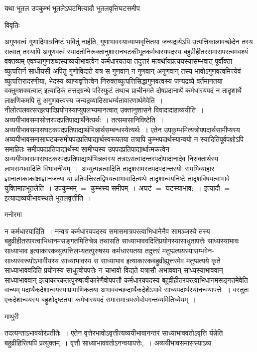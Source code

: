 \documentclass[10pt, openany]{book}
\begin{document}
{{\la यथा भूतल उपकुम्भं भूतलेऽघटमित्यादौ भूतलवृत्तिघटसमीप}
\begin{center}     विवृतिः \end{center}
अगुणवत्वं गुणादिमात्रनिष्टं भवितुं नार्हति,  गुणाभावस्याव्याप्यवृत्तितया जन्यद्रव्येऽपि उत्पत्तिकालावच्छेदेन तस्य सत्वात् तस्यापि अगुणवत्वं स्यादतोनिरूक्तानुशासनघटकीभूतकर्मधारयपदस्य बहुव्रीहीतरसमासपरत्वमवश्यं वक्तव्यम् एवञ्चागुणशब्दस्याव्ययीभावत्वेन कर्मधारयतया तदुत्तरं मत्वर्थीयप्रत्ययस्यासम्भवात् पूर्वोक्ता व्युत्पत्तिर्न साधीयसी अपितु गुणोविद्यते यत्र स गुणवान् न गुणवान् अगुणवान् तस्य भावोऽगुणवत्वमित्त्येवं व्युत्पत्तिरादरणीया, भेदस्य
व्याप्यवृत्तित्वेन निरुक्तव्युत्पत्तिसिद्धागुणवत्वस्य जन्यद्रव्ये वर्तमानतया वक्तुमशक्यत्वात् इत्यादिकं तत्तद्ग्रन्थे परिस्फुटं तथाच प्राचीनमते दोषप्रदानार्थे कर्मधारयपदं न तादृशार्थे
लाक्षणिकमपि तु अगुणवत्त्वस्य जन्यद्रव्यादिसाधर्म्यतावारणार्थमेवेति~। नीलोत्पलवत्सरइत्यादिप्रयोगस्याप्युपलभ्यमानत्वात् उक्तानुशासने विवादादाहाव्ययीति~।
अव्ययीभावसमासोत्तरपदप्रतिपाद्यार्थेनेत्यर्थः~। {\la तत्समासानिविष्टेति~।} अव्ययीभावसमासघटकपदप्रतिपाद्यार्थभिन्नार्थसम्बन्धस्येत्यर्थः~। एतेन
उपकुम्भमित्यत्रोपपदार्थसामीप्यस्य अव्ययीभावसमासाघटकसमीपपदप्रतिपाद्यार्थस्वरूपतया तत्रापि कुम्भपदार्थस्यान्वयो न स्यादितिपूर्वपक्षोऽपि समाहितः
समीपपदप्रतिपाद्यार्थस्य सामीप्यस्य उपपदप्रतिपाद्यार्थात्मकत्वेन अव्ययीभावसमासघटकरपदप्रतिपाद्यार्थभिन्नत्वस्य तत्राऽसत्वादन्तरपदोपादानादेव निरुक्तार्थस्य लाभसम्भवादिति विभावनीयम्~।~{\la अव्युत्पन्नत्वादिति} तादृशसमस्तपदपदान्तरयोः समभिव्याहार ज्ञानात्मकाकांक्षाज्ञानजन्या या प्रतिपत्तिस्तद्विषयत्वाभावादित्यर्थः
तादृशान्वयनिष्टे तादृशविषयत्वाभावे युक्तिमाहभूतलेति~। उपकुम्भम् $=$ कुम्भस्य समीपम्~। अघटं $=$  घटस्याभाव:~। इत्यादौ $=$ इत्याद्यव्ययीभावस्थले {\la भूतलवृत्तीति~।}
\begin{center}   मनोरमा  \end{center}

{\la न कर्मधारयादिति~।} नन्वत्र कर्मधारयपदस्य समासमात्रपरत्वाभिधानेनैव सामञ्जस्ये तस्य बहुव्रीहीतरपरत्वाभिधानमसङ्गतमितिचेन्न तथासति
साध्याभाववदितिप्रयोगस्यासाधुतापत्तेः साध्यस्याभावः साध्याभाव इत्याकारकव्युत्पत्तिलभ्यतत्पुरुषस्य कर्मधारयतया तदुत्तरं मतुप्प्रत्ययस्यासम्भवेन-साध्यस्वरूपोऽभावीयस्य साध्याभावस्य स साध्याभाव इत्याकारकबहुव्रीह्युत्तरमेव मतुप्प्रत्यये कृते साध्याभाववदिति प्रयोगस्य साधुत्वोपपत्तेः न चाभावो विद्यते यत्रासौ अभाववान् साध्यस्याभाववान् साध्याभाववान् इत्याकारकतत्पुरुषत्वीकारेणैवोपपत्तौ कर्मधारयपदस्य बहुव्रीहीतरपरत्वाभिधानमसङ्गतमेवेति वाच्यम् पदार्थैकदेशान्वयस्याप्रामाणिकतया अभाववच्छब्दार्थैकदेशेऽभावे साध्यपदार्थस्यानन्वयापत्तेः~। वस्तुतः  एकदेशान्वयस्य बहुशोदृष्टतया कर्मधारयपदं समासमात्रपरमेवोपगन्तव्यमितिध्येयम्~।
\newpage
\lfoot{}
\begin{center}  माथुरी  \end{center} 
{\la तदत्यन्ताऽभावयोरप्रतीतेः~। एतेन वृत्तेरभावोऽवृत्तीत्यव्ययीभावानन्तरं साध्याभाववतोऽवृत्ति र्यन्नेति बहुव्रीहिरित्यपि प्रत्युक्तम्~। वृत्तौ साध्याभाववतोऽनन्वयापत्तेः,~। अव्ययीभावसमासस्याऽव्य}

}
\end{document}
